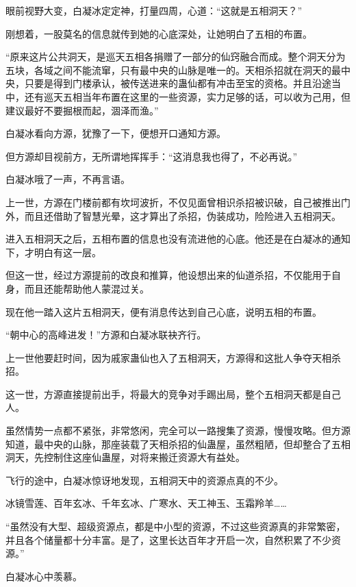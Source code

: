 
\begin{this_body}

眼前视野大变，白凝冰定定神，打量四周，心道：“这就是五相洞天？”

刚想着，一股莫名的信息就传到她的心底深处，让她明白了五相的布置。

“原来这片公共洞天，是巡天五相各捐赠了一部分的仙窍融合而成。整个洞天分为五块，各域之间不能流窜，只有最中央的山脉是唯一的。天相杀招就在洞天的最中央，只要是得到门楼承认，被传送进来的蛊仙都有冲击至宝的资格。并且沿途当中，还有巡天五相当年布置在这里的一些资源，实力足够的话，可以收为己用，但建议最好不要掘根而起，涸泽而渔。”

白凝冰看向方源，犹豫了一下，便想开口通知方源。

但方源却目视前方，无所谓地挥挥手：“这消息我也得了，不必再说。”

白凝冰哦了一声，不再言语。

上一世，方源在门楼前都有坎坷波折，不仅见面曾相识杀招被识破，自己被推出门外，而且还借助了智慧光晕，这才算出了杀招，伪装成功，险险进入五相洞天。

进入五相洞天之后，五相布置的信息也没有流进他的心底。他还是在白凝冰的通知下，才明白有这一层。

但这一世，经过方源提前的改良和推算，他设想出来的仙道杀招，不仅能用于自身，而且还能帮助他人蒙混过关。

现在他一踏入这片五相洞天，便有消息传达到自己心底，说明五相的布置。

“朝中心的高峰进发！”方源和白凝冰联袂齐行。

上一世他要赶时间，因为戚家蛊仙也入了五相洞天，方源得和这批人争夺天相杀招。

这一世，方源直接提前出手，将最大的竞争对手踢出局，整个五相洞天都是自己人。

虽然情势一点都不紧张，非常悠闲，完全可以一路搜集了资源，慢慢攻略。但方源知道，最中央的山脉，那座装载了天相杀招的仙蛊屋，虽然粗陋，但却整合了五相洞天，先控制住这座仙蛊屋，对将来搬迁资源大有益处。

飞行的途中，白凝冰惊讶地发现，五相洞天中的资源点真的不少。

冰镜雪莲、百年玄冰、千年玄冰、广寒水、天工神玉、玉霜羚羊……

“虽然没有大型、超级资源点，都是中小型的资源，不过这些资源真的非常繁密，并且各个储量都十分丰富。是了，这里长达百年才开启一次，自然积累了不少资源。”

白凝冰心中羡慕。


\end{this_body}
